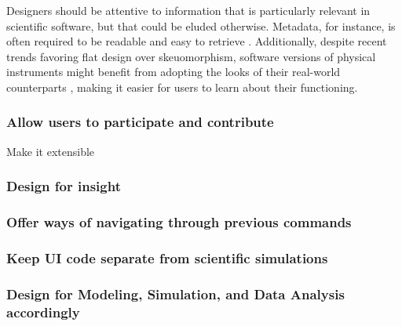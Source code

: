 Designers should be attentive to information that is particularly relevant in scientific software, but that could be eluded otherwise. Metadata, for instance, is often required to be readable and easy to retrieve  \cite{Talbott:2005, Baxter:2006, Macaulay:2009, Keefe:2010, DeMatos:2013, bestprSC, Thomer:2016}. Additionally, despite recent trends favoring flat design over skeuomorphism, software versions of physical instruments might benefit from adopting the looks of their real-world counterparts \cite{Foster:1998}, making it easier for users to learn about their functioning.  



\subsubsection{Allow users to participate and contribute} Make it extensible

\subsubsection{Design for insight}

\subsubsection{Offer ways of navigating through previous commands}

\subsubsection{Keep UI code separate from scientific simulations}

\subsubsection{Design for Modeling, Simulation, and Data Analysis accordingly}

